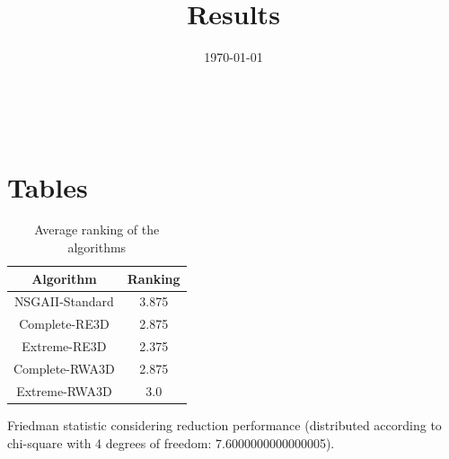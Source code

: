 \documentclass{article}
\title{Results}
\author{}
\date{\today}
\begin{document}
\oddsidemargin 0in \topmargin 0in\maketitle
\
\section{Tables}
\begin{table}[!htp]
\centering
\caption{Average ranking of the algorithms}
\begin{tabular}{c|c}
Algorithm&Ranking\\
\hline
NSGAII-Standard&3.875\\
Complete-RE3D&2.875\\
Extreme-RE3D&2.375\\
Complete-RWA3D&2.875\\
Extreme-RWA3D&3.0\\
\end{tabular}
\end{table}


Friedman statistic considering reduction performance (distributed according to chi-square with 4 degrees of freedom: 7.6000000000000005).
\end{document}
